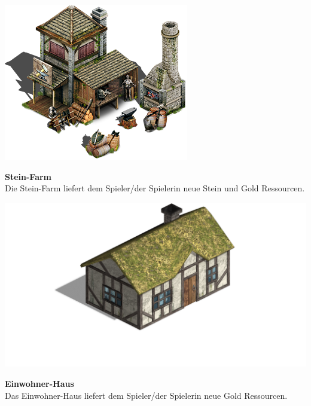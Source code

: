 \documentclass{scrartcl}
\begin{document}
\begin{minipage}{0.3\textwidth}
	\includegraphics[width=\textwidth]{imgStoneFarm.png}
\end{minipage}
\hfill
\begin{minipage}{0.5\textwidth}
	\textbf{Stein-Farm}\\
	Die Stein-Farm liefert dem Spieler/der Spielerin neue Stein und Gold Ressourcen.\\

\end{minipage}

\begin{minipage}{0.3\textwidth}
	\includegraphics[width=\textwidth]{imgInhabitant.png}
\end{minipage}
\hfill
\begin{minipage}{0.5\textwidth}
	\textbf{Einwohner-Haus}\\
	Das Einwohner-Haus liefert dem Spieler/der Spielerin neue Gold Ressourcen.\\

\end{minipage}
\end{document}
